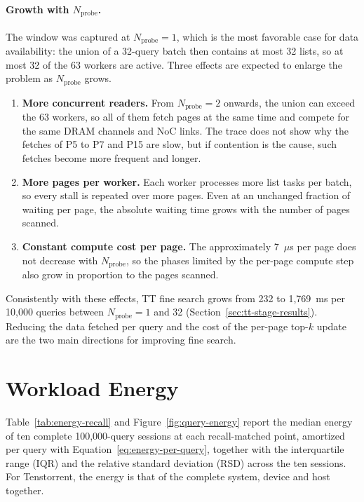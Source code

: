 \paragraph{Growth with \(N_{\mathrm{probe}}\).}
The window was captured at \(N_{\mathrm{probe}}=1\), which is the most
favorable case for data availability: the union of a 32-query batch then
contains at most 32 lists, so at most 32 of the 63 workers are active. Three
effects are expected to enlarge the problem as \(N_{\mathrm{probe}}\) grows.
\begin{enumerate}
    \item \textbf{More concurrent readers.} From \(N_{\mathrm{probe}}=2\)
    onwards, the union can exceed the 63 workers, so all of them fetch pages
    at the same time and compete for the same DRAM channels and NoC links.
    The trace does not show why the fetches of P5 to P7 and P15 are slow, but
    if contention is the cause, such fetches become more frequent and longer.
    \item \textbf{More pages per worker.} Each worker processes more list
    tasks per batch, so every stall is repeated over more pages. Even at an
    unchanged fraction of waiting per page, the absolute waiting time grows
    with the number of pages scanned.
    \item \textbf{Constant compute cost per page.} The approximately
    7~\(\mu\)s per page does not decrease with \(N_{\mathrm{probe}}\), so the
    phases limited by the per-page compute step also grow in proportion to
    the pages scanned.
\end{enumerate}
Consistently with these effects, TT fine search grows from 232 to
1,769~ms per 10,000 queries between \(N_{\mathrm{probe}}=1\) and 32
(Section~\ref{sec:tt-stage-results}).
Reducing the data fetched per query and the cost of the per-page top-\(k\)
update are the two main directions for improving fine search.

\section{Workload Energy}
\label{sec:energy-results}

Table~\ref{tab:energy-recall} and Figure~\ref{fig:query-energy} report the
median energy of ten complete 100,000-query sessions at each recall-matched
point, amortized per query with Equation~\ref{eq:energy-per-query}, together
with the interquartile range (IQR) and the relative standard deviation (RSD)
across the ten sessions. For Tenstorrent, the energy is that of the complete
system, device and host together.

